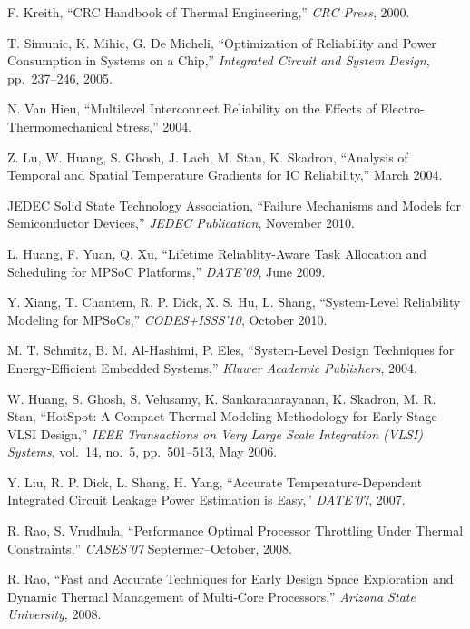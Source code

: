 \begin{thebibliography}{99}
    F. Kreith,
    ``CRC Handbook of Thermal Engineering,''
    \emph{CRC Press},
    2000.

    T. Simunic, K. Mihic, G. De Micheli,
    ``Optimization of Reliability and Power Consumption in Systems on a Chip,''
    \emph{Integrated Circuit and System Design},
    pp.~237--246, 2005.

    N. Van Hieu,
    ``Multilevel Interconnect Reliability on the Effects of Electro-Thermomechanical Stress,''
    2004.

    Z. Lu, W. Huang, S. Ghosh, J. Lach, M. Stan, K. Skadron,
    ``Analysis of Temporal and Spatial Temperature Gradients for IC Reliability,''
    March 2004.

    JEDEC Solid State Technology Association,
    ``Failure Mechanisms and Models for Semiconductor Devices,''
    \emph{JEDEC Publication},
    November 2010.

    L. Huang, F. Yuan, Q. Xu,
    ``Lifetime Reliablity-Aware Task Allocation and Scheduling for MPSoC Platforms,''
    \emph{DATE'09},
    June 2009.

    Y. Xiang, T. Chantem, R. P. Dick, X. S. Hu, L. Shang,
    ``System-Level Reliability Modeling for MPSoCs,''
    \emph{CODES+ISSS'10},
    October 2010.

    M. T. Schmitz, B. M. Al-Hashimi, P. Eles,
    ``System-Level Design Techniques for Energy-Efficient Embedded Systems,''
    \emph{Kluwer Academic Publishers},
    2004.

    W. Huang, S. Ghosh, S. Velusamy, K. Sankaranarayanan, K. Skadron, M. R. Stan,
    ``HotSpot: A Compact Thermal Modeling Methodology for Early-Stage VLSI Design,''
    \emph{IEEE Transactions on Very Large Scale Integration (VLSI) Systems},
    vol.~14, no.~5, pp.~501--513, May 2006.

    Y. Liu, R. P. Dick, L. Shang, H. Yang,
    ``Accurate Temperature-Dependent Integrated Circuit Leakage Power Estimation is Easy,''
    \emph{DATE'07},
    2007.

    R. Rao, S. Vrudhula,
    ``Performance Optimal Processor Throttling Under Thermal Constraints,''
    \emph{CASES'07}
    Septermer--October, 2008.

    R. Rao,
    ``Fast and Accurate Techniques for Early Design Space Exploration and Dynamic Thermal Management of Multi-Core Processors,''
    \emph{Arizona State University},
    2008.


\end{thebibliography}
